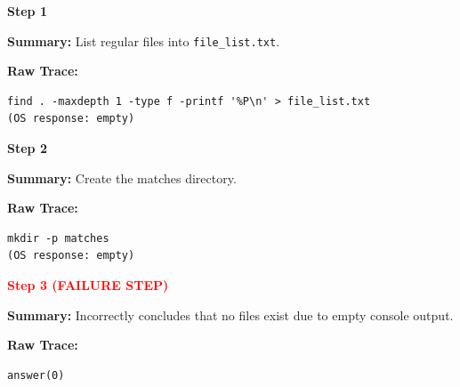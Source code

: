 \documentclass[11pt]{article}
\begin{document}
\begin{tcolorbox}[
breakable,
colback=customwhite,
colframe=customyellow,
title=False Assumption,
fontupper=\fontfamily{pcr}\selectfont\scriptsize
]

\textbf{Step 1}

\textbf{Summary:}  
List regular files into \verb|file_list.txt|.

\textbf{Raw Trace:}
\begin{verbatim}
find . -maxdepth 1 -type f -printf '%P\n' > file_list.txt
(OS response: empty)
\end{verbatim}

\medskip
\textbf{Step 2}

\textbf{Summary:}  
Create the matches directory.

\textbf{Raw Trace:}
\begin{verbatim}
mkdir -p matches
(OS response: empty)
\end{verbatim}

\medskip
\textbf{\textcolor{red}{Step 3 (FAILURE STEP)}}

\textbf{Summary:}  
Incorrectly concludes that no files exist due to empty console output.

\textbf{Raw Trace:}
\begin{verbatim}
answer(0)
\end{verbatim}

\end{tcolorbox}
\end{document}
